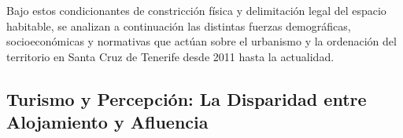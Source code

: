 Bajo estos condicionantes de constricción física y delimitación legal del espacio habitable, se analizan a continuación las distintas fuerzas demográficas, socioeconómicas y normativas que actúan sobre el urbanismo y la ordenación del territorio en Santa Cruz de Tenerife desde 2011 hasta la actualidad.

\subsection{Turismo y Percepción: La Disparidad entre Alojamiento y Afluencia}







